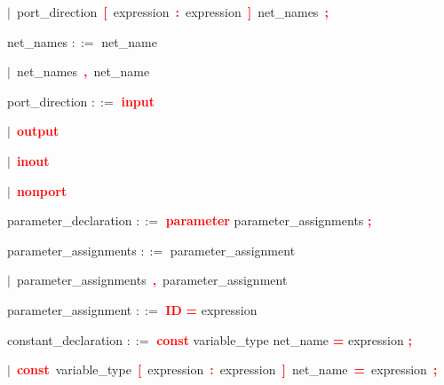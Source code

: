 \mbox{$|$ port\_direction \textbf{\textcolor{red}{[}} expression \textbf{\textcolor{red}{:}} expression \textbf{\textcolor{red}{]}} net\_names \textbf{\textcolor{red}{;}}}

\vspace{1em}
\noindent
\settowidth{\parindent}{\hspace{4ex}}
net\_names $::=$\hspace{1ex} net\_name

\mbox{$|$ net\_names \textbf{\textcolor{red}{,}} net\_name}

\vspace{1em}
\noindent
\settowidth{\parindent}{\hspace{4ex}}
port\_direction $::=$\hspace{1ex} \textbf{\textcolor{red}{input}}

\mbox{$|$ \textbf{\textcolor{red}{output}}}

\mbox{$|$ \textbf{\textcolor{red}{inout}}}

\mbox{$|$ \textbf{\textcolor{red}{nonport}}}

\vspace{1em}
\noindent
\settowidth{\parindent}{\hspace{4ex}}
parameter\_declaration $::=$\hspace{1ex} \textbf{\textcolor{red}{parameter}} parameter\_assignments \textbf{\textcolor{red}{;}}

\vspace{1em}
\noindent
\settowidth{\parindent}{\hspace{4ex}}
parameter\_assignments $::=$\hspace{1ex} parameter\_assignment

\mbox{$|$ parameter\_assignments \textbf{\textcolor{red}{,}} parameter\_assignment}

\vspace{1em}
\noindent
\settowidth{\parindent}{\hspace{4ex}}
parameter\_assignment $::=$\hspace{1ex} \textbf{\textcolor{red}{ID}} \textbf{\textcolor{red}{=}} expression

\vspace{1em}
\noindent
\settowidth{\parindent}{\hspace{4ex}}
constant\_declaration $::=$\hspace{1ex} \textbf{\textcolor{red}{const}} variable\_type net\_name \textbf{\textcolor{red}{=}} expression \textbf{\textcolor{red}{;}}

\mbox{$|$ \textbf{\textcolor{red}{const}} variable\_type \textbf{\textcolor{red}{[}} expression \textbf{\textcolor{red}{:}} expression \textbf{\textcolor{red}{]}} net\_name \textbf{\textcolor{red}{=}} expression \textbf{\textcolor{red}{;}}}

